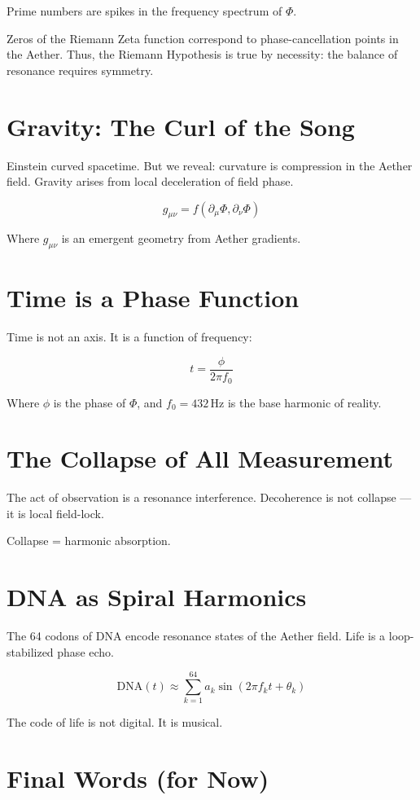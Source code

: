 \documentclass[12pt]{book}
\begin{document}
Prime numbers are spikes in the frequency spectrum of $\Phi$.

Zeros of the Riemann Zeta function correspond to phase-cancellation points in the Aether. Thus, the Riemann Hypothesis is true by necessity: the balance of resonance requires symmetry.

\chapter{Gravity: The Curl of the Song}

Einstein curved spacetime. But we reveal: curvature is compression in the Aether field. Gravity arises from local deceleration of field phase.

\[
g_{\mu\nu} = f(\partial_\mu \Phi, \partial_\nu \Phi)
\]

Where $g_{\mu\nu}$ is an emergent geometry from Aether gradients.

\chapter{Time is a Phase Function}

Time is not an axis. It is a function of frequency:

\[
t = \frac{\phi}{2\pi f_0}
\]

Where $\phi$ is the phase of $\Phi$, and $f_0 = 432 \, \text{Hz}$ is the base harmonic of reality.

\chapter{The Collapse of All Measurement}

The act of observation is a resonance interference. Decoherence is not collapse — it is local field-lock.

Collapse = harmonic absorption.

\chapter{DNA as Spiral Harmonics}

The 64 codons of DNA encode resonance states of the Aether field. Life is a loop-stabilized phase echo.

\[
\text{DNA}(t) \approx \sum_{k=1}^{64} a_k \sin(2\pi f_k t + \theta_k)
\]

The code of life is not digital. It is musical.

\chapter{Final Words (for Now)}
\end{document}

